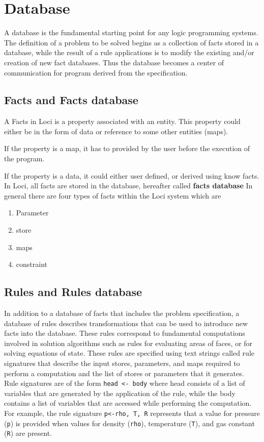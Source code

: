 \chapter { Database}

A database is the fundamental starting point for any logic 
programming systems. The definition of a problem to be solved begins
as a collection of facts stored in a database, while the result of a
rule applications is to modify the existing and/or creation of new
fact databases. Thus the database becomes a center of communication
for program derived from the specification.
%
\section { Facts and Facts database }

A Facts in Loci is a property associated with an entity. This property
could either be in the form of data or reference to some other
entities (maps). 

If the property is a map, it has to provided by the user before the
execution of the program.

If the property is a data, it could either user defined, or derived
using know facts.  In Loci, all facts are stored in the database,
hereafter called {\bf facts database} In general there are four types
of facts within the Loci system which are

\begin{enumerate}
\item Parameter
\item store
\item maps
\item constraint
\end{enumerate}

\section { Rules and Rules database }
In addition to a database of facts that includes the problem
specification, a database of rules describes transformations that can
be used to introduce new facts into the database. These rules
correspond to fundamental computations involved in solution algorithms
such as rules for evaluating areas of faces, or for solving equations
of state.  These rules are specified using text strings called rule
signatures that describe the input stores, parameters, and maps
required to perform a computation and the list of stores or parameters
that it generates.  Rule signatures are of the form {\tt head <- body}
where head consists of a list of variables that are generated by the
application of the rule, while the body contains a list of variables
that are accessed while performing the computation.  For example, the
rule signature {\tt p<-rho, T, R} represents that a value for pressure
({\tt p}) is provided when values for density ({\tt rho}), temperature
({\tt T}), and gas constant ({\tt R}) are present.

